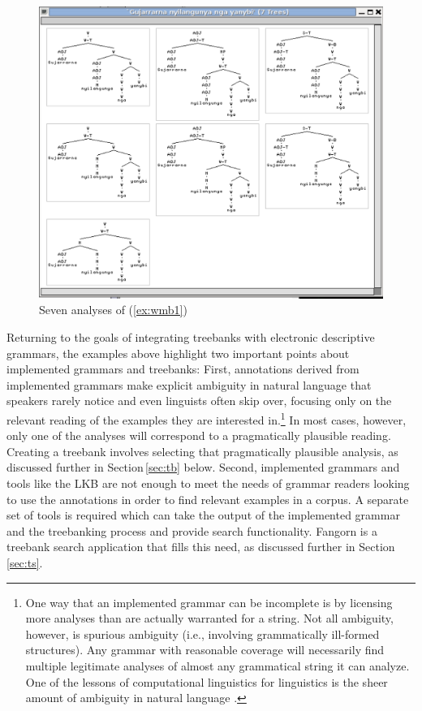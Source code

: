 \documentclass[12pt]{article}
\newcommand{\sref}[1]{Section$\,$\ref{#1}}
\begin{document}
\begin{figure}[t]
\centering
\includegraphics[width=5in]{trees}
\caption{Seven analyses of (\ref{ex:wmb1})}
\label{fig:lkb}
\end{figure}


Returning to the goals of integrating treebanks with electronic
descriptive grammars, the examples above highlight two important
points about implemented grammars and treebanks:
%
First, annotations derived from implemented grammars make explicit
ambiguity in natural language that speakers rarely notice and even
linguists often skip over, focusing only on the relevant reading of
the examples they are interested in.\footnote{One way that an
  implemented grammar can be incomplete is by licensing more analyses
  than are actually warranted for a string.  Not all ambiguity,
  however, is spurious ambiguity (i.e., involving
  grammatically ill-formed structures).  Any grammar with reasonable
  coverage will necessarily find multiple legitimate analyses of
almost any grammatical string it can analyze.  One of the lessons
of computational linguistics for linguistics is the sheer amount
of ambiguity in natural language \cite{Abney:96}.} 
In most cases, however,
only one of the analyses will correspond to a pragmatically plausible
reading.  Creating a treebank involves selecting that pragmatically
plausible analysis, as discussed further in \sref{sec:tb} below.
%
Second, implemented grammars and tools like the LKB are not enough
to meet the needs of grammar readers looking to use the annotations
in order to find relevant examples in a corpus.  A separate set of
tools is required which can take the output of the implemented
grammar and the treebanking process and provide search functionality.
Fangorn \cite{Gho:Bir:10} is a treebank search application that fills this 
need, as discussed further in \sref{sec:ts}.
\end{document}
